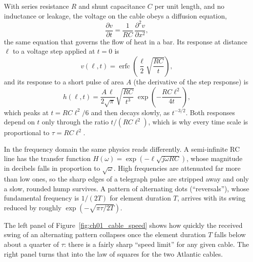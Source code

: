 
\begin{deeper}
With series resistance $R$ and shunt capacitance $C$ per unit length, and no inductance or leakage,
the voltage on the cable obeys a diffusion equation,
\begin{equation}
\frac{\partial v}{\partial t} = \frac{1}{RC}\,\frac{\partial^2 v}{\partial x^2},
\label{eq:ch01:diffusion}
\end{equation}
the same equation that governs the flow of heat in a bar. Its response at distance $\ell$ to a
voltage step applied at $t=0$ is
\begin{equation}
v(\ell,t) = \operatorname{erfc}\!\left(\frac{\ell}{2}\sqrt{\frac{RC}{t}}\right),
\label{eq:ch01:erfc}
\end{equation}
and its response to a short pulse of area $A$ (the derivative of the step response) is
\begin{equation}
h(\ell,t) = \frac{A\,\ell}{2\sqrt{\pi}}\sqrt{\frac{RC}{t^3}}\;\exp\!\left(-\frac{RC\ell^2}{4t}\right),
\end{equation}
which peaks at $t = RC\ell^2/6$ and then decays slowly, as $t^{-3/2}$. Both responses depend on $t$
only through the ratio $t/(RC\ell^2)$, which is why every time scale is proportional to
$\tau=RC\ell^2$.

In the frequency domain the same physics reads differently. A semi-infinite RC line has the transfer
function $H(\omega)=\exp(-\ell\sqrt{j\omega RC})$, whose magnitude in decibels falls in proportion
to $\sqrt{\omega}$. High frequencies are attenuated far more than low ones, so the sharp edges of a
telegraph pulse are stripped away and only a slow, rounded hump survives. A pattern of alternating
dots (``reversals''), whose fundamental frequency is $1/(2T)$ for element duration $T$, arrives with
its swing reduced by roughly $\exp(-\sqrt{\pi\tau/2T})$.
\end{deeper}

The left panel of Figure~\ref{fig:ch01_cable_speed} shows how quickly the received swing of an
alternating pattern collapses once the element duration $T$ falls below about a quarter of $\tau$:
there is a fairly sharp ``speed limit'' for any given cable. The right panel turns that into the law
of squares for the two Atlantic cables.

